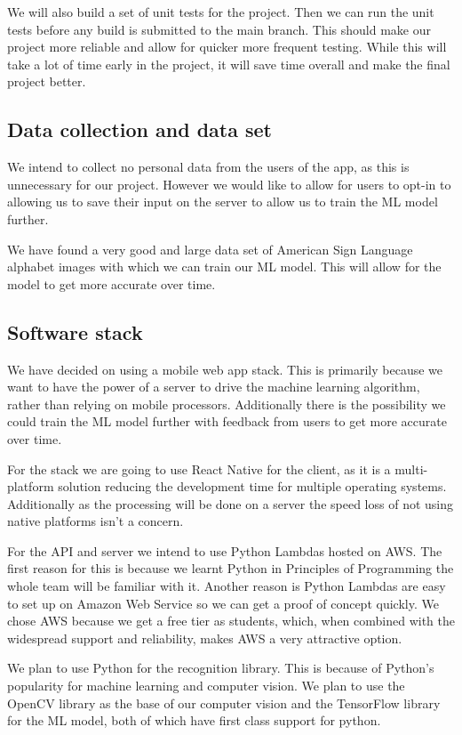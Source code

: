 \documentclass[10pt]{article}
\begin{document}
We will also build a set of unit tests for the project. Then we can run the unit tests before any 
build is submitted to the main branch. This should make our project more reliable and allow for 
quicker more frequent testing. While this will take a lot of time early in the project, it will save 
time overall and make the final project better.

\subsection{Data collection and data set}

We intend to collect no personal data from the users of the app, as this is unnecessary for our 
project. However we would like to allow for users to opt-in to allowing us to save their input on 
the server to allow us to train the ML model further. 

We have found a very good and large data set of American Sign Language alphabet images with which we 
can train our ML model. This will allow for the model to get more accurate over time.

\subsection{Software stack}

We have decided on using a mobile web app stack. This is primarily because we want to have the power 
of a server to drive the machine learning algorithm, rather than relying on mobile processors. 
Additionally there is the possibility we could train the ML model further with feedback from users 
to get more accurate over time.

For the stack we are going to use React Native for the client, as it is a multi-platform solution 
reducing the development time for multiple operating systems. Additionally as the processing will be 
done on a server the speed loss of not using native platforms isn't a concern.

For the API and server we intend to use Python Lambdas hosted on AWS. The first reason for this is 
because we learnt Python in Principles of Programming the whole team will be familiar with it. 
Another reason is Python Lambdas are easy to set up on Amazon Web Service so we can get a proof of 
concept quickly. We chose AWS because we get a free tier as students, which, when combined with the 
widespread support and reliability, makes AWS a very attractive option.

We plan to use Python for the recognition library. This is because of Python's popularity for 
machine learning and computer vision. We plan to use the OpenCV library as the base of our computer 
vision and the TensorFlow library for the ML model, both of which have first class support for 
python.
\end{document}
